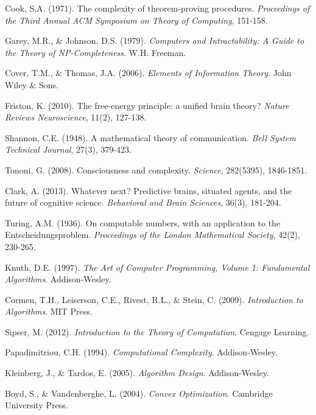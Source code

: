 \documentclass[12pt,a4paper]{article}
\begin{document}

\begin{thebibliography}{99}

Cook, S.A. (1971). The complexity of theorem-proving procedures. \textit{Proceedings of the Third Annual ACM Symposium on Theory of Computing}, 151-158.

Garey, M.R., \& Johnson, D.S. (1979). \textit{Computers and Intractability: A Guide to the Theory of NP-Completeness}. W.H. Freeman.

Cover, T.M., \& Thomas, J.A. (2006). \textit{Elements of Information Theory}. John Wiley \& Sons.

Friston, K. (2010). The free-energy principle: a unified brain theory? \textit{Nature Reviews Neuroscience}, 11(2), 127-138.

Shannon, C.E. (1948). A mathematical theory of communication. \textit{Bell System Technical Journal}, 27(3), 379-423.

Tononi, G. (2008). Consciousness and complexity. \textit{Science}, 282(5395), 1846-1851.

Clark, A. (2013). Whatever next? Predictive brains, situated agents, and the future of cognitive science. \textit{Behavioral and Brain Sciences}, 36(3), 181-204.

Turing, A.M. (1936). On computable numbers, with an application to the Entscheidungsproblem. \textit{Proceedings of the London Mathematical Society}, 42(2), 230-265.

Knuth, D.E. (1997). \textit{The Art of Computer Programming, Volume 1: Fundamental Algorithms}. Addison-Wesley.

Cormen, T.H., Leiserson, C.E., Rivest, R.L., \& Stein, C. (2009). \textit{Introduction to Algorithms}. MIT Press.

Sipser, M. (2012). \textit{Introduction to the Theory of Computation}. Cengage Learning.

Papadimitriou, C.H. (1994). \textit{Computational Complexity}. Addison-Wesley.

Kleinberg, J., \& Tardos, E. (2005). \textit{Algorithm Design}. Addison-Wesley.

Boyd, S., \& Vandenberghe, L. (2004). \textit{Convex Optimization}. Cambridge University Press.


\end{thebibliography}
\end{document}
